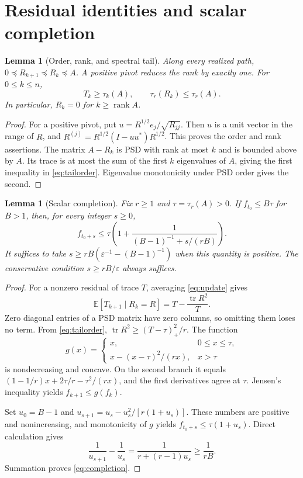 \documentclass[11pt]{article}
\newtheorem{lemma}[theorem]{Lemma}
\theoremstyle{remark}\newtheorem{remark}[theorem]{Remark}
\DeclareMathOperator{\tr}{tr}
\DeclareMathOperator{\rank}{rank}
\newcommand{\E}{\mathbb E}
\newcommand{\eps}{\varepsilon}
\begin{document}
\section{Residual identities and scalar completion}
\begin{lemma}[Order, rank, and spectral tail]
Along every realized path, $0\preceq R_{k+1}\preceq R_k\preceq A$. A positive pivot reduces the rank by exactly one. For $0\le k\le n$,
\begin{equation}
 T_k\ge\tau_k(A),\qquad \tau_r(R_k)\le\tau_r(A). \label{eq:tailorder}
\end{equation}
In particular, $R_k=0$ for $k\ge\rank A$.
\end{lemma}
\begin{proof}
For a positive pivot, put $u=R^{1/2}e_j/\sqrt{R_{jj}}$. Then $u$ is a unit vector in the range of $R$, and $R^{(j)}=R^{1/2}(I-uu^*)R^{1/2}$. This proves the order and rank assertions. The matrix $A-R_k$ is PSD with rank at most $k$ and is bounded above by $A$. Its trace is at most the sum of the first $k$ eigenvalues of $A$, giving the first inequality in \eqref{eq:tailorder}. Eigenvalue monotonicity under PSD order gives the second.
\end{proof}

\begin{lemma}[Scalar completion]\label{lem:scalar}
Fix $r\ge1$ and $\tau=\tau_r(A)>0$. If $f_{t_0}\le B\tau$ for $B>1$, then, for every integer $s\ge0$,
\begin{equation}
 f_{t_0+s}\le\tau\left(1+
 \frac{1}{(B-1)^{-1}+s/(rB)}\right). \label{eq:completion}
\end{equation}
It suffices to take $s\ge rB(\eps^{-1}-(B-1)^{-1})$ when this quantity is positive. The conservative condition $s\ge rB/\eps$ always suffices.
\end{lemma}
\begin{proof}
For a nonzero residual of trace $T$, averaging \eqref{eq:update} gives
\begin{equation}
 \E[T_{k+1}\mid R_k=R]=T-\frac{\tr R^2}{T}. \label{eq:onedrift}
\end{equation}
Zero diagonal entries of a PSD matrix have zero columns, so omitting them loses no term. From \eqref{eq:tailorder}, $\tr R^2\ge (T-\tau)_+^2/r$. The function
\[
 g(x)=\begin{cases}
 x,&0\le x\le\tau,\\
 x-(x-\tau)^2/(rx),&x>\tau
 \end{cases}
\]
is nondecreasing and concave. On the second branch it equals $(1-1/r)x+2\tau/r-\tau^2/(rx)$, and the first derivatives agree at $\tau$. Jensen's inequality yields $f_{k+1}\le g(f_k)$.

Set $u_0=B-1$ and $u_{s+1}=u_s-u_s^2/[r(1+u_s)]$. These numbers are positive and nonincreasing, and monotonicity of $g$ yields $f_{t_0+s}\le\tau(1+u_s)$. Direct calculation gives
\[
 \frac1{u_{s+1}}-\frac1{u_s}
 =\frac1{r+(r-1)u_s}\ge\frac1{rB}.
\]
Summation proves \eqref{eq:completion}.
\end{proof}
\end{document}

